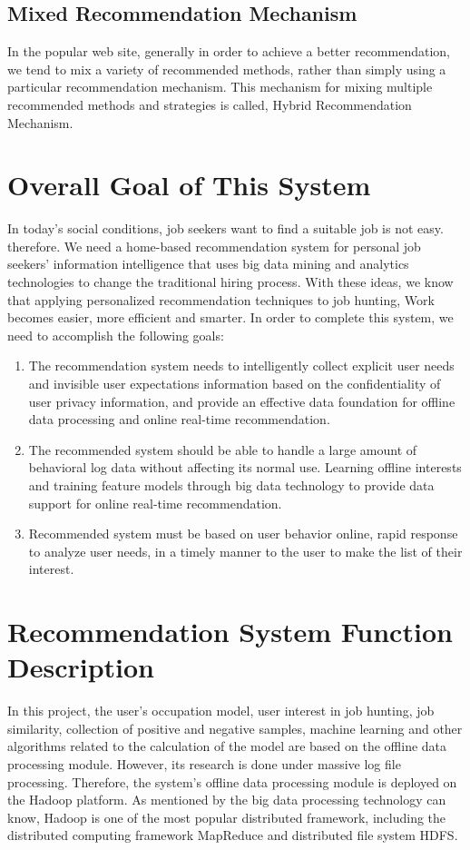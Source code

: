 \documentclass[sigconf]{acmart}
\begin{document}
\subsection{Mixed Recommendation Mechanism}
In the popular web site, generally in order to achieve a better recommendation, we tend to mix a variety of recommended methods, rather than simply using a particular recommendation mechanism. This mechanism for mixing multiple recommended methods and strategies is called, Hybrid Recommendation Mechanism.




\section{Overall Goal of This System}
In today's social conditions, job seekers want to find a suitable job is not easy. therefore. We need a home-based recommendation system for personal job seekers' information intelligence that uses big data mining and analytics technologies to change the traditional hiring process. With these ideas, we know that applying personalized recommendation techniques to job hunting, Work becomes easier, more efficient and smarter. In order to complete this system, we need to accomplish the following goals:

\begin{enumerate}
  \item  The recommendation system needs to intelligently collect explicit user needs and invisible user expectations information based on the confidentiality of user privacy information, and provide an effective data foundation for offline data processing and online real-time recommendation.
  \item The recommended system should be able to handle a large amount of behavioral log data without affecting its normal use. Learning offline interests and training feature models through big data technology to provide data support for online real-time recommendation.
  \item  Recommended system must be based on user behavior online, rapid response to analyze user needs, in a timely manner to the user to make the list of their interest.

\end{enumerate}


\section{Recommendation System Function Description}
In this project, the user's occupation model, user interest in job hunting, job similarity, collection of positive and negative samples, machine learning and other algorithms related to the calculation of the model are based on the offline data processing module. However, its research is done under massive log file processing. Therefore, the system's offline data processing module is deployed on the Hadoop platform. As mentioned by the big data processing technology can know, Hadoop is one of the most popular distributed framework, including the distributed computing framework MapReduce and distributed file system HDFS.
\end{document}
